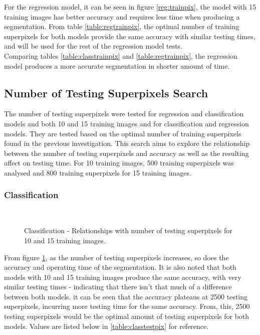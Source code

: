 For the regression model, it can be seen in figure \ref{reg:trainpix}, the model with 15 training images has better accuracy and requires less time when producing a segmentation. From table \ref{table:regtrainpix}, the optimal number of training superpixels for both models provide the same accuracy with similar testing times, and will be used for the rest of the regression model tests.
\\[1\baselineskip]
 Comparing tables \ref{table:classtrainpix} and \ref{table:regtrainpix}, the regression model produces a more accurate segmentation in shorter amount of time. 

\subsection{Number of Testing Superpixels Search}
The number of testing superpixels were tested for regression and classification models and both 10 and 15 training images and for classification and regression models. They are tested based on the optimal number of training superpixels found in the previous investigation. This search aims to explore the relationship between the number of testing superpixels and accuracy as well as the resulting affect on testing time. For 10 training images, 500 training superpixels was analysed and 800 training superpixels for 15 training images.

\subsubsection{Classification}
\begin{figure}[H]
    \centering
    \\
    \caption{Classification - Relationships with number of testing superpixels for 10 and 15 training images.}%
    \label{class:testpix}
\end{figure}

From figure \ref{class:testpix}, as the number of testing superpixels increases, so does the accuracy and operating time of the segmentation. It is also noted that both models with 10 and 15 training images produce the same accuracy, with very similar testing times - indicating that there isn't that much of a difference between both models. it can be seen that the accuracy plateaus at 2500 testing superpixels, incurring more testing time for the same accuracy. From, this, 2500 testing superpixels would be the optimal amount of testing superpixels for both models. Values are listed below in \ref{table:classtestpix} for reference.

